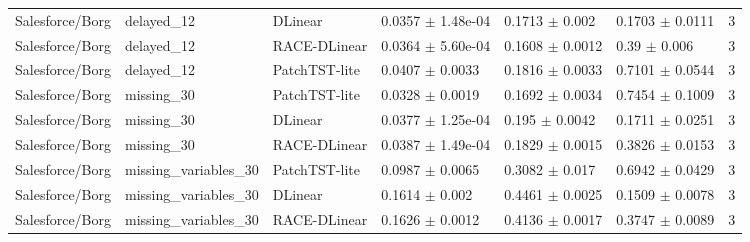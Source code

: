 \begin{table}[t]
{\begin{tabular}{llllllr}
Salesforce/Borg & delayed\_12 & DLinear & 0.0357 $\pm$ 1.48e-04 & 0.1713 $\pm$ 0.002 & 0.1703 $\pm$ 0.0111 & 3 \\
Salesforce/Borg & delayed\_12 & RACE-DLinear & 0.0364 $\pm$ 5.60e-04 & 0.1608 $\pm$ 0.0012 & 0.39 $\pm$ 0.006 & 3 \\
Salesforce/Borg & delayed\_12 & PatchTST-lite & 0.0407 $\pm$ 0.0033 & 0.1816 $\pm$ 0.0033 & 0.7101 $\pm$ 0.0544 & 3 \\
Salesforce/Borg & missing\_30 & PatchTST-lite & 0.0328 $\pm$ 0.0019 & 0.1692 $\pm$ 0.0034 & 0.7454 $\pm$ 0.1009 & 3 \\
Salesforce/Borg & missing\_30 & DLinear & 0.0377 $\pm$ 1.25e-04 & 0.195 $\pm$ 0.0042 & 0.1711 $\pm$ 0.0251 & 3 \\
Salesforce/Borg & missing\_30 & RACE-DLinear & 0.0387 $\pm$ 1.49e-04 & 0.1829 $\pm$ 0.0015 & 0.3826 $\pm$ 0.0153 & 3 \\
Salesforce/Borg & missing\_variables\_30 & PatchTST-lite & 0.0987 $\pm$ 0.0065 & 0.3082 $\pm$ 0.017 & 0.6942 $\pm$ 0.0429 & 3 \\
Salesforce/Borg & missing\_variables\_30 & DLinear & 0.1614 $\pm$ 0.002 & 0.4461 $\pm$ 0.0025 & 0.1509 $\pm$ 0.0078 & 3 \\
Salesforce/Borg & missing\_variables\_30 & RACE-DLinear & 0.1626 $\pm$ 0.0012 & 0.4136 $\pm$ 0.0017 & 0.3747 $\pm$ 0.0089 & 3 \\
\bottomrule
\end{tabular}
}
\end{table}
